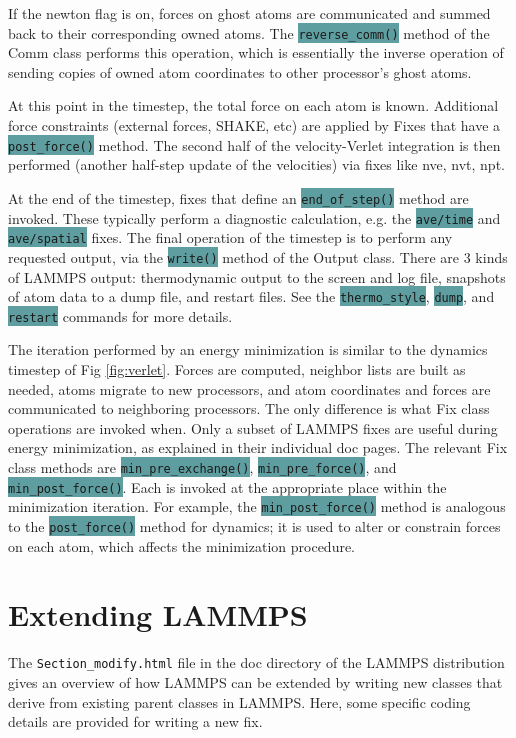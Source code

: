 \documentclass{article}
\newcommand{\path}[1]{\colorbox{light-gray}{\texttt{#1}}}
\newcommand{\code}[1]{\colorbox{cadetblue}{\color{white}\texttt{#1}}}
\begin{document}
If the newton flag is on, forces on ghost atoms are communicated and
summed back to their corresponding owned atoms.  The \code{reverse\_comm()}
method of the Comm class performs this operation, which is essentially
the inverse operation of sending copies of owned atom coordinates to
other processor's ghost atoms.

At this point in the timestep, the total force on each atom is known.
Additional force constraints (external forces, SHAKE, etc) are applied
by Fixes that have a \code{post\_force()} method.  The second half of the
velocity-Verlet integration is then performed (another half-step
update of the velocities) via fixes like nve, nvt, npt.

At the end of the timestep, fixes that define an \code{end\_of\_step()} method
are invoked. These typically perform a diagnostic calculation, e.g. the
\code{ave/time} and \code{ave/spatial} fixes. The final operation of the
timestep is to perform any requested output, via the \code{write()} method of
the Output class. There are 3 kinds of LAMMPS output: thermodynamic output to
the screen and log file, snapshots of atom data to a dump file, and restart
files. See the \code{thermo\_style}, \code{dump}, and \code{restart} commands
for more details.

The iteration performed by an energy minimization is similar to the dynamics
timestep of Fig \ref{fig:verlet}. Forces are computed, neighbor lists are built
as needed, atoms migrate to new processors, and atom coordinates and forces are
communicated to neighboring processors. The only difference is what Fix class
operations are invoked when. Only a subset of LAMMPS fixes are useful during
energy minimization, as explained in their individual doc pages. The relevant
Fix class methods are \code{min\_pre\_exchange()}, \code{min\_pre\_force()}, and
\code{min\_post\_force()}. Each is invoked at the appropriate place within the
minimization iteration. For example, the \code{min\_post\_force()} method is
analogous to the \code{post\_force()} method for dynamics; it is used to alter
or constrain forces on each atom, which affects the minimization procedure.

\pagebreak
\section{Extending LAMMPS}

The \path{Section\_modify.html} file in the doc directory of
the LAMMPS distribution gives an overview of how LAMMPS can
be extended by writing new classes that derive from existing
parent classes in LAMMPS.  Here, some specific coding
details are provided for writing a new fix.
\end{document}
